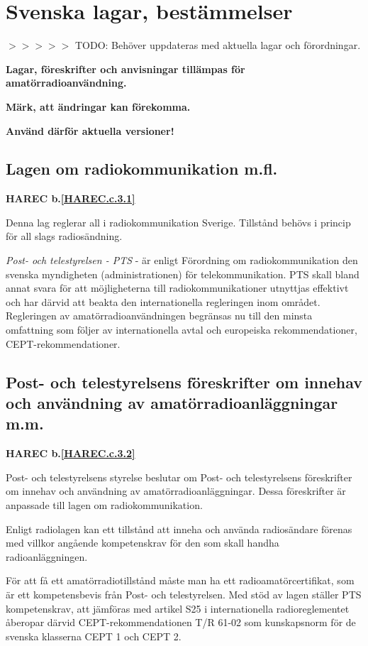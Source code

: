 \section{Svenska lagar, bestämmelser}

$>>>>>$ TODO: Behöver uppdateras med aktuella lagar och förordningar.

\textbf{Lagar, föreskrifter och anvisningar tillämpas för
  amatörradioanvändning.}

\textbf{Märk, att ändringar kan förekomma.}

\textbf{Använd därför aktuella versioner!}


\subsection{Lagen om radiokommunikation m.fl.}
\textbf{
HAREC b.\ref{HAREC.c.3.1}\label{myHAREC.c.3.1}
}

Denna lag reglerar all i radiokommunikation Sverige. Tillstånd behövs
i princip för all slags radiosändning.

\emph{Post- och telestyrelsen - PTS} - är enligt Förordning om
radiokommunikation den svenska myndigheten (administrationen) för
telekommunikation. PTS skall bland annat svara för att möjligheterna
till radiokommunikationer utnyttjas effektivt och har därvid att
beakta den internationella regleringen inom området. Regleringen av
amatörradioanvändningen begränsas nu till den minsta omfattning som
följer av internationella avtal och europeiska rekommendationer,
CEPT-rekommendationer.

\subsection{Post- och telestyrelsens föreskrifter om innehav och
användning av amatörradioanläggningar m.m.}
\textbf{
HAREC b.\ref{HAREC.c.3.2}\label{myHAREC.c.3.2}
}

Post- och telestyrelsens styrelse beslutar om Post- och telestyrelsens
föreskrifter om innehav och användning av amatörradioanläggningar.
Dessa föreskrifter är anpassade till lagen om radiokommunikation.

Enligt radiolagen kan ett tillstånd att inneha och använda
radiosändare förenas med villkor angående kompetenskrav för den som
skall handha radioanläggningen.

För att få ett amatörradiotillstånd måste man ha ett
radioamatörcertifikat, som är ett kompetensbevis från Post- och
telestyrelsen. Med stöd av lagen ställer PTS kompetenskrav, att jämföras
med artikel S25 i internationella radioreglementet åberopar därvid
CEPT-rekommendationen T/R 61-02 som kunskapsnorm för de svenska
klasserna CEPT 1 och CEPT 2.

